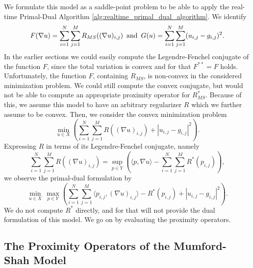 \documentclass[abstracton]{scrreprt}
\begin{document}
            We formulate this model as a saddle-point problem to be able to apply the real-time Primal-Dual Algorithm \ref{alg:realtime_primal_dual_algorithm}. We identify
                $$
                    F(\nabla u) = \sum\limits_{i = 1}^{N} \sum\limits_{j = 1}^{M} R_{MS}((\nabla u)_{i,j}) \,\,\, \textnormal{and} \,\,\, G(u) = \sum\limits_{i = 1}^{N} \sum\limits_{j = 1}^{M} (u_{i,j} - g_{i,j})^{2}.
                $$
            In the earlier sections we could easily compute the Legendre-Fenchel conjugate of the function $F$, since the total variation is convex and for that $F^{\ast\ast} = F$ holds. Unfortunately, the function $F$, containing $R_{MS}$, is non-convex in the considered minimization problem. We could still compute the convex conjugate, but would not be able to compute an appropriate proximity operator for $R_{MS}^{\ast}$. Because of this, we assume this  model to have an arbitrary regularizer $R$ which we further assume to be convex. Then, we consider the convex minimization problem
                $$
                    \min_{u \in X} \left( \sum_{i = 1}^{N} \sum_{j = 1}^{M} R((\nabla u)_{i,j}) + |u_{i,j} - g_{i,j}|^{2} \right).
                $$
            Expressing $R$ in terms of its Legendre-Fenchel conjugate, namely
                $$
                    \sum_{i = 1}^{N} \sum_{j = 1}^{M} R((\nabla u)_{i,j}) = \sup\limits_{p \in Y} \left( \langle p, \nabla u \rangle - \sum_{i = 1}^{N} \sum_{j = 1}^{M} R^{\ast}(p_{i,j}) \right),
                $$
            we observe the primal-dual formulation by
                $$
                    \min_{u \in X}\, \max_{p \in Y} \left( \sum_{i = 1}^{N} \sum_{j = 1}^{M} \langle p_{i,j}, (\nabla u)_{i,j} \rangle - R^{\ast}(p_{i,j}) + |u_{i,j} - g_{i,j}|^{2} \right).
                $$
            We do not compute $R^{\ast}$ directly, and for that will not provide the dual formulation of this model. We go on by evaluating the proximity operators.

        \subsection{The Proximity Operators of the Mumford-Shah Model} %
        \label{sub:the_proximity_operators_of_the_mumford_shah_model}
            
\end{document}
